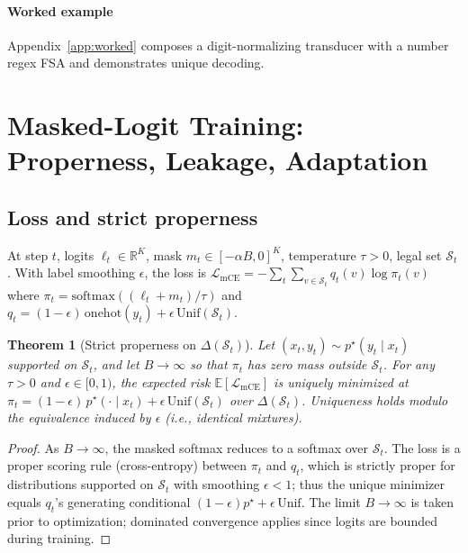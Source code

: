 \documentclass{article}
\newtheorem{theorem}{Theorem}
\begin{document}
\paragraph{Worked example}
Appendix~\ref{app:worked} composes a digit-normalizing transducer with a number regex FSA and demonstrates unique decoding.

\section{Masked-Logit Training: Properness, Leakage, Adaptation}
\subsection{Loss and strict properness}
At step $t$, logits $\ell_t\in\mathbb{R}^K$, mask $m_t\in[-\alpha B,0]^K$, temperature $\tau>0$, legal set $\mathcal{S}_t$. With label smoothing $\epsilon$, the loss is
$\mathcal{L}_{\mathrm{mCE}}=-\sum_t \sum_{v\in\mathcal{S}_t} q_t(v) \log \pi_t(v)$
where $\pi_t=\mathrm{softmax}((\ell_t+m_t)/\tau)$ and $q_t=(1-\epsilon)\,\mathrm{onehot}(y_t)+\epsilon\,\mathrm{Unif}(\mathcal{S}_t)$.

\begin{theorem}[Strict properness on $\Delta(\mathcal{S}_t)$]\label{thm:proper}
Let $(x_t,y_t)\sim p^\star(y_t\mid x_t)$ supported on $\mathcal{S}_t$, and let $B\to\infty$ so that $\pi_t$ has zero mass outside $\mathcal{S}_t$. For any $\tau>0$ and $\epsilon\in[0,1)$, the expected risk $\mathbb{E}[\mathcal{L}_{\mathrm{mCE}}]$ is uniquely minimized at $\pi_t = (1-\epsilon)\,p^\star(\cdot\mid x_t) + \epsilon\,\mathrm{Unif}(\mathcal{S}_t)$ over $\Delta(\mathcal{S}_t)$. Uniqueness holds modulo the equivalence induced by $\epsilon$ (i.e., identical mixtures).
\end{theorem}

\begin{proof}
As $B\to\infty$, the masked softmax reduces to a softmax over $\mathcal{S}_t$. The loss is a proper scoring rule (cross-entropy) between $\pi_t$ and $q_t$, which is strictly proper for distributions supported on $\mathcal{S}_t$ with smoothing $\epsilon<1$; thus the unique minimizer equals $q_t$'s generating conditional $(1-\epsilon)p^\star+\epsilon\,\mathrm{Unif}$. The limit $B\to\infty$ is taken prior to optimization; dominated convergence applies since logits are bounded during training.
\end{proof}
\end{document}

